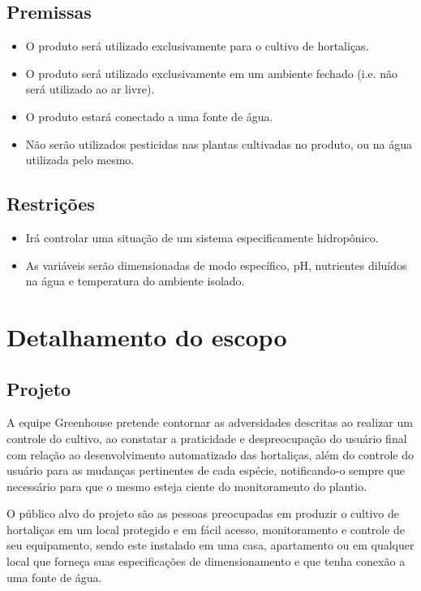  \subsection{Premissas}
  
 \begin{itemize}
 	\item  O produto será utilizado exclusivamente para o cultivo de hortaliças.
 	\item O produto será utilizado exclusivamente em um ambiente fechado (i.e. não será utilizado ao ar livre).
 	\item  O produto estará conectado a uma fonte de água.
 	\item Não serão utilizados pesticidas nas plantas cultivadas no produto, ou na água utilizada pelo mesmo.
 \end{itemize}
  
  \subsection{Restrições}
  
  \begin{itemize}
  	\item Irá controlar uma situação de um sistema especificamente hidropônico.
  	\item As variáveis serão dimensionadas de modo específico, pH, nutrientes diluídos na água e temperatura do ambiente isolado.
  \end{itemize}
                             

\section{Detalhamento do escopo}
\subsection{Projeto}
A equipe Greenhouse pretende contornar as adversidades descritas ao realizar um controle do cultivo, ao constatar a praticidade e despreocupação do usuário final com relação ao desenvolvimento automatizado das hortaliças, além do controle do usuário para as mudanças pertinentes de cada espécie, notificando-o sempre que necessário para que o mesmo esteja ciente do monitoramento do plantio.

O público alvo do projeto são as pessoas preocupadas em produzir o cultivo de hortaliças em um local protegido e em fácil acesso, monitoramento e controle de seu equipamento, sendo este instalado em uma casa, apartamento ou em qualquer local que forneça suas especificações de dimensionamento e que tenha conexão a uma fonte de água.

